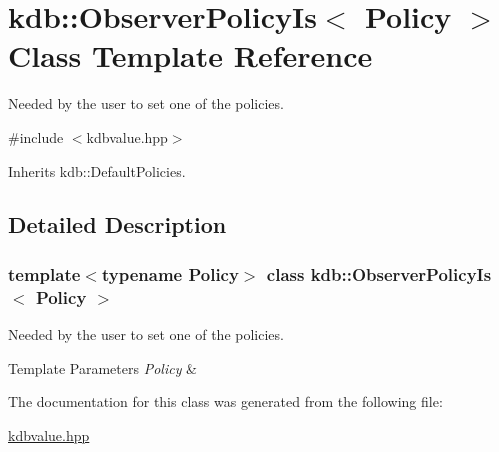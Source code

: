 \hypertarget{classkdb_1_1ObserverPolicyIs}{}\section{kdb\+:\+:Observer\+Policy\+Is$<$ Policy $>$ Class Template Reference}
\label{classkdb_1_1ObserverPolicyIs}


Needed by the user to set one of the policies.  




{\ttfamily \#include $<$kdbvalue.\+hpp$>$}



Inherits kdb\+::\+Default\+Policies.



\subsection{Detailed Description}
\subsubsection*{template$<$typename Policy$>$\newline
class kdb\+::\+Observer\+Policy\+Is$<$ Policy $>$}

Needed by the user to set one of the policies. 


\begin{DoxyTemplParams}{Template Parameters}
{\em Policy} & \\
\hline
\end{DoxyTemplParams}


The documentation for this class was generated from the following file\+:\begin{DoxyCompactItemize}
\item 
\hyperlink{kdbvalue_8hpp}{kdbvalue.\+hpp}\end{DoxyCompactItemize}
